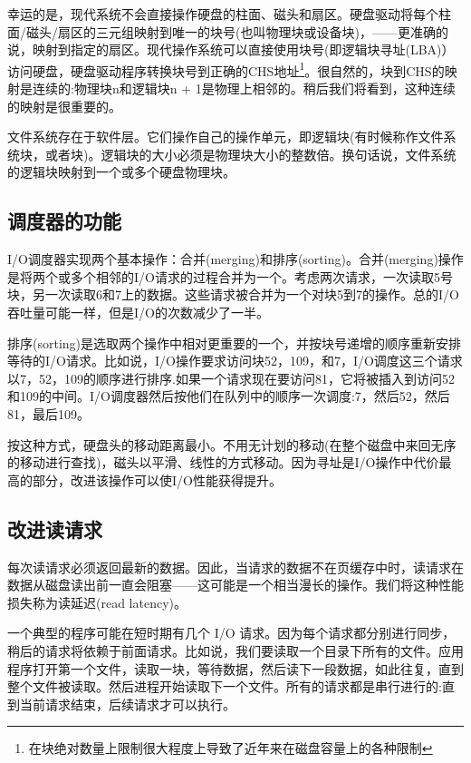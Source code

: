 幸运的是，现代系统不会直接操作硬盘的柱面、磁头和扇区。硬盘驱动将每个柱面/磁头/扇区的三元组映射到唯一的块号(也叫物理块或设备块)，——更准确的说，映射到指定的扇区。现代操作系统可以直接使用块号(即逻辑块寻址(LBA)）访问硬盘，硬盘驱动程序转换块号到正确的CHS地址\footnote[1]{在块绝对数量上限制很大程度上导致了近年来在磁盘容量上的各种限制}。很自然的，块到CHS的映射是连续的:物理块n和逻辑块n + 1是物理上相邻的。稍后我们将看到，这种连续的映射是很重要的。

文件系统存在于软件层。它们操作自己的操作单元，即逻辑块(有时候称作文件系统块，或者块)。逻辑块的大小必须是物理块大小的整数倍。换句话说，文件系统的逻辑块映射到一个或多个硬盘物理块。

\subsection{调度器的功能}

I/O调度器实现两个基本操作：合并(merging)和排序(sorting)。合并(merging)操作是将两个或多个相邻的I/O请求的过程合并为一个。考虑两次请求，一次读取5号块，另一次读取6和7上的数据。这些请求被合并为一个对块5到7的操作。总的I/O吞吐量可能一样，但是I/O的次数减少了一半。
     
排序(sorting)是选取两个操作中相对更重要的一个，并按块号递增的顺序重新安排等待的I/O请求。比如说，I/O操作要求访问块52，109，和7，I/O调度这三个请求以7，52，109的顺序进行排序.如果一个请求现在要访问81，它将被插入到访问52和109的中间。I/O调度器然后按他们在队列中的顺序一次调度:7，然后52，然后81，最后109。

按这种方式，硬盘头的移动距离最小。不用无计划的移动(在整个磁盘中来回无序的移动进行查找)，磁头以平滑、线性的方式移动。因为寻址是I/O操作中代价最高的部分，改进该操作可以使I/O性能获得提升。

\subsection{改进读请求}

每次读请求必须返回最新的数据。因此，当请求的数据不在页缓存中时，读请求在数据从磁盘读出前一直会阻塞——这可能是一个相当漫长的操作。我们将这种性能损失称为读延迟(read latency)。

一个典型的程序可能在短时期有几个 I/O 请求。因为每个请求都分别进行同步，稍后的请求将依赖于前面请求。比如说，我们要读取一个目录下所有的文件。应用程序打开第一个文件，读取一块，等待数据，然后读下一段数据，如此往复，直到整个文件被读取。然后进程开始读取下一个文件。所有的请求都是串行进行的:直到当前请求结束，后续请求才可以执行。

